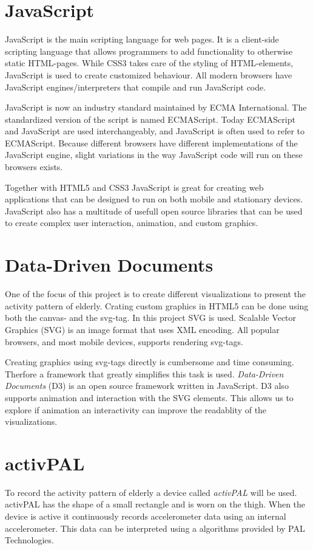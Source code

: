 \section{JavaScript}
JavaScript is the main scripting language for web pages. It is a client-side scripting language that allows programmers to add functionality to otherwise static HTML-pages. While CSS3 takes care of the styling of HTML-elements, JavaScript is used to create customized behaviour. All modern browsers have JavaScript engines/interpreters that compile and run JavaScript code.

JavaScript is now an industry standard maintained by ECMA International. The standardized version of the script is named ECMAScript. Today ECMAScript and JavaScript are used interchangeably, and JavaScript is often used to refer to ECMAScript. Because different browsers have different implementations of the JavaScript engine, slight variations in the way JavaScript code will run on these browsers exists.

Together with HTML5 and CSS3 JavaScript is great for creating web applications that can be designed to run on both mobile and stationary devices. JavaScript also has a multitude of usefull open source libraries that can be used to create complex user interaction, animation, and custom graphics.

\section{Data-Driven Documents}
One of the focus of this project is to create different visualizations to present the activity pattern of elderly. Crating custom graphics in HTML5 can be done using both the canvas- and the svg-tag. In this project SVG is used. Scalable Vector Graphics (SVG) is an image format that uses XML encoding. All popular browsers, and most mobile devices, supports rendering svg-tags.

Creating graphics using svg-tags directly is cumbersome and time consuming. Therfore a framework that greatly simplifies this task is used. \emph{Data-Driven Documents} (D3) is an open source framework written in JavaScript. D3 also supports animation and interaction with the SVG elements. This allows us to explore if animation an interactivity can improve the readablity of the visualizations. 

\section{activPAL}
To record the activity pattern of elderly a device called \emph{activPAL} will be used. activPAL has the shape of a small rectangle and is worn on the thigh. When the device is active it continuously records accelerometer data using an internal accelerometer. This data can be interpreted using a algorithms provided by PAL Technologies.

